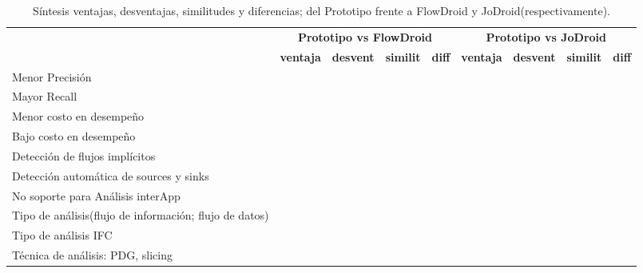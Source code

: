 \begin{table}[H]
\small\addtolength{\tabcolsep}{-3pt}
\begin{tabular}{|p{4cm}|p{1cm}|p{1cm}|p{1cm}|p{1cm}|p{1cm}|p{1cm}|p{1cm}|p{1cm}|}
	\hline
	{\multirow{2}{*}{\textbf{Item}}}
	&\multicolumn{4}{c|}{\cellcolor{gray!30}\textbf{Prototipo vs FlowDroid}} &
	\multicolumn{4}{c|}{\cellcolor{gray!55}\textbf{Prototipo vs JoDroid}}\\
	\cline{2-9}
	 & \cellcolor{gray!30}\tiny{\textbf{ventaja}} &
	 \cellcolor{gray!30}\tiny{\textbf{desvent}} &
	 \cellcolor{gray!30}\tiny{\textbf{similit}}&
	 \cellcolor{gray!30}\tiny{\textbf{diff}} &
	 \cellcolor{gray!55}\tiny{\textbf{ventaja}} &
	 \cellcolor{gray!55}\tiny{\textbf{desvent}} &
	 \cellcolor{gray!55}\tiny{\textbf{similit}}&
	 \cellcolor{gray!55}\tiny{\textbf{diff}}\\
	\hline
	\footnotesize{Menor Precisión} & &\checkmark & & & &\checkmark& &\\
	\hline
	Mayor Recall &\checkmark& & & &\checkmark& & &\\
	\hline
	Menor costo en desempeño & & & & &\checkmark& & &\\
	\hline
	Bajo costo en desempeño & & &\checkmark& & & & & \\
	\hline
	Detección de flujos implícitos & \checkmark& & & & & &\checkmark&\\
	\hline
	Detección automática de sources y sinks & & &\checkmark& &\checkmark& & & \\
	\hline
	No soporte para Análisis interApp & &\checkmark& & & & &\checkmark&\\
	\hline
	\footnotesize{Tipo de análisis(flujo de información; flujo de datos)} & & &
	&\checkmark& & & &\\
	\hline
	Tipo de análisis IFC & & & & & & &\checkmark&\\
	\hline
	Técnica de análisis: PDG, slicing & & & & & & & &\checkmark\\
	\hline
\end{tabular}
\caption{Síntesis ventajas, desventajas, similitudes y diferencias; del
Prototipo frente a FlowDroid y JoDroid(respectivamente).\newline}
\label{tab:resumen}
\end{table}

